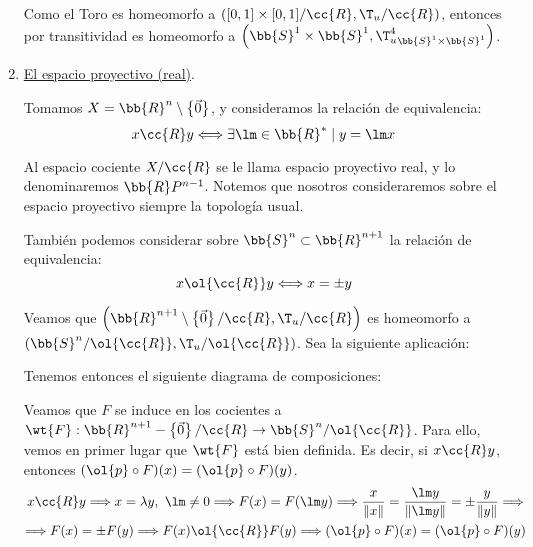 \begin{ejemplo}
\begin{enumerate}
        Como el Toro es homeomorfo a $\left([0,1]\times [0,1]/\cc{R}, \T_u/\cc{R}\right)$, entonces por transitividad es homeomorfo a $\left(\bb{S}^1\times \bb{S}^1, {\T_u^4}_{\bb{S}^1\times \bb{S}^1}\right)$.

        \item \ul{El espacio proyectivo (real)}.

        Tomamos $X=\bb{R}^n\setminus \left\{\vec{0}\right\}$, y consideramos la relación de equivalencia:
        \begin{equation*}
            x\cc{R}y \Longleftrightarrow \exists\lm \in \bb{R}^\ast\mid y =\lm x 
        \end{equation*}

        Al espacio cociente $X/\cc{R}$ se le llama espacio proyectivo real, y lo denominaremos $\bb{R}P^{n-1}$. Notemos que nosotros consideraremos sobre el espacio proyectivo siempre la topología usual.

        También podemos considerar sobre $\bb{S}^n\subset \bb{R}^{n+1}$ la relación de equivalencia:
        \begin{equation*}
            x\ol{\cc{R}}y \Longleftrightarrow x=\pm y
        \end{equation*}

        
        Veamos que $\left(\bb{R}^{n+1}\setminus \left\{\vec{0}\right\}/\cc{R}, \T_u/\cc{R}\right)$ es homeomorfo a $(\bb{S}^n/\ol{\cc{R}}, \T_u/\ol{\cc{R}})$. Sea la siguiente aplicación:

        Tenemos entonces el siguiente diagrama de composiciones:
        \begin{figure}[H]
            \centering
        \end{figure}

        Veamos que $F$ se induce en los cocientes a $\wt{F}:\bb{R}^{n+1}-\left\{\vec{0}\right\}/\cc{R}\to \bb{S}^n/\ol{\cc{R}}$. Para ello, vemos en primer lugar que $\wt{F}$ está bien definida. Es decir, si $x\cc{R}y$, entonces $(\ol{p}\circ F)(x) = (\ol{p}\circ F)(y)$.
        \begin{multline*}
            x\cc{R}y \Longrightarrow x=\lambda y,~\lm \neq 0 \Longrightarrow F(x)=F(\lm y) \Longrightarrow \frac{x}{\|x\|} = \frac{\lm y}{\|\lm y\|} = \pm \frac{y}{\|y\|} \Longrightarrow \\ \Longrightarrow F(x) = \pm F(y) \Longrightarrow F(x)\ol{\cc{R}}F(y) \Longrightarrow (\ol{p}\circ F)(x) = (\ol{p}\circ F)(y)
        \end{multline*}


\end{enumerate}
\end{ejemplo}
